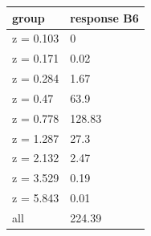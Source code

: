 \begingroup\small
\setlength{\tabcolsep}{3pt}
\renewcommand{\arraystretch}{1.04}
\begin{tabularx}{\linewidth}{XX}
\toprule
group & response B6 \\
\midrule
z = 0.103 & 0 \\
z = 0.171 & 0.02 \\
z = 0.284 & 1.67 \\
z = 0.47 & 63.9 \\
z = 0.778 & 128.83 \\
z = 1.287 & 27.3 \\
z = 2.132 & 2.47 \\
z = 3.529 & 0.19 \\
z = 5.843 & 0.01 \\
all & 224.39 \\
\bottomrule
\end{tabularx}
\endgroup
